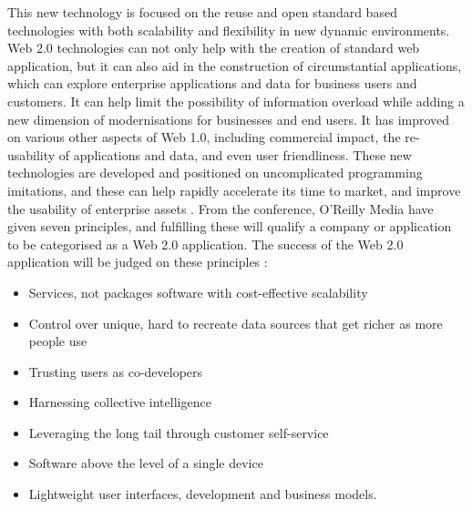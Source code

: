 This new technology is focused on the reuse and open standard based technologies with both scalability and flexibility in new dynamic environments. Web 2.0 technologies can not only help with the creation of standard web application, but it can also aid in the construction of circumstantial applications, which can explore enterprise applications and data for business users and customers. It can help limit the possibility of information  overload while adding a new dimension of modernisations for businesses and end users. It has improved on various other aspects of Web 1.0, including commercial impact, the re-usability of applications and data, and even user friendliness. These new technologies are developed and positioned on uncomplicated programming imitations, and these can help rapidly accelerate its time to market, and improve the usability of enterprise assets \cite{21}. From the conference, O'Reilly Media have given seven principles, and fulfilling these will qualify a company or application to be categorised as a Web 2.0 application. The success of the Web 2.0 application will be judged on these principles \cite{webtim}: 

\begin{itemize}
\item Services, not packages software with cost-effective scalability
\item Control over unique, hard to recreate data sources that get richer as more people use
\item Trusting users as co-developers
\item Harnessing collective intelligence
\item  Leveraging the long tail through customer self-service
\item Software above the level of a single device
\item Lightweight user interfaces, development and business models.  
\end{itemize}


